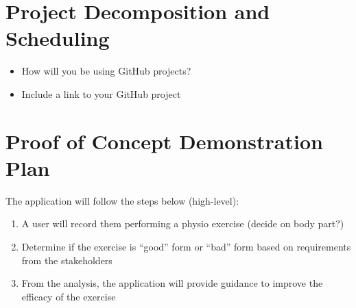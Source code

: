 \documentclass{article}
\begin{document}
\section{Project Decomposition and Scheduling}

\begin{itemize}
  \item How will you be using GitHub projects?
  \item Include a link to your GitHub project
\end{itemize}


\section{Proof of Concept Demonstration Plan}

The application will follow the steps below (high-level):
\begin{enumerate}
  \item A user will record them performing a physio exercise (decide on body part?)
  \item Determine if the exercise is “good” form or “bad” form based on requirements from the stakeholders
  \item From the analysis, the application will provide guidance to improve the efficacy of the exercise
\end{enumerate}
\end{document}
